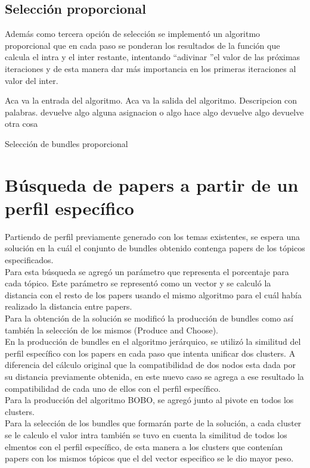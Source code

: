 \subsection{Selección proporcional}
Además como tercera opción de selección se implementó un algoritmo proporcional que en cada paso se 
ponderan los resultados de la función que calcula el intra y el inter restante, intentando 
\textquotedblleft adivinar \textquotedblright el valor de las próximas iteraciones y de esta manera 
dar más importancia en los primeras iteraciones al valor del inter.
\begin{algorithm}
\begin{algorithmic}[1]
\REQUIRE Aca va la entrada del algoritmo.
\ENSURE Aca va la salida del algoritmo.
\STATE Descripcion con palabras.
\RETURN devuelve algo
\ELSE
\STATE alguna asignacion o algo
\ENDIF
\ENDWHILE
{}
\STATE hace algo
\RETURN devuelve algo
\ENDIF
\ENDFOR
\RETURN devuelve otra cosa
\end{algorithmic}
\caption{Selección de bundles proporcional}\label{alg:algSelProp}
\end{algorithm}

\section{Búsqueda de papers a partir de un perfil específico}
Partiendo de perfil previamente generado con los temas existentes, se espera una solución en la 
cuál el conjunto de bundles obtenido contenga papers de los tópicos especificados. \\
Para esta búsqueda se agregó un parámetro que representa el porcentaje para cada tópico. Este 
parámetro se representó como un vector y se calculó la distancia con el resto de los papers usando 
el mismo algoritmo para el cuál había realizado la distancia entre papers. \\
Para la obtención de la solución se modificó la producción de bundles como así también la 
selección de los mismos (Produce and Choose). \\
En la producción de bundles en el algoritmo jerárquico, se utilizó la similitud del perfil 
específico con los papers en cada paso que intenta unificar dos clusters. A diferencia del cálculo 
original que la compatibilidad de dos nodos esta dada por su distancia previamente obtenida, en 
este nuevo caso se agrega a ese resultado la compatibilidad de cada uno de ellos con el perfil 
específico. \\
Para la producción del algoritmo BOBO, se agregó junto al pivote en todos los clusters. \\
Para la selección de los bundles que formarán parte de la solución, a cada cluster se le 
calculo el valor intra también se tuvo en cuenta la similitud de todos los elmentos con el perfil  
específico, de esta manera a los clusters que contenían papers con los mismos tópicos que el del 
vector especifico se le dio mayor peso.

